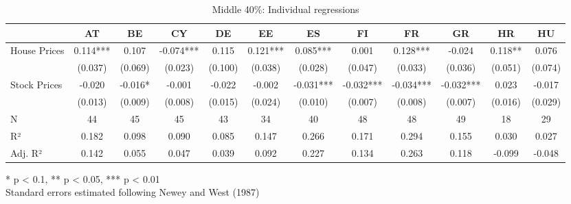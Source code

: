 \documentclass[
  a4paper,
  DIV=11,
  numbers=noendperiod]{scrartcl}
\begin{document}
\begin{landscape}

\begin{table}[h]
\caption{Middle 40\%: Individual regressions} 
\fontsize{7.5pt}{9.0pt}\selectfont
\begin{tabular*}{\linewidth}{@{\extracolsep{\fill}}lccccccccccc}
\toprule
  & AT & BE & CY & DE & EE & ES & FI & FR & GR & HR & HU \\ 
\midrule\addlinespace[2.5pt]
House Prices & 0.114*** & 0.107 & -0.074*** & 0.115 & 0.121*** & 0.085*** & 0.001 & 0.128*** & -0.024 & 0.118** & 0.076 \\ 
 & (0.037) & (0.069) & (0.023) & (0.100) & (0.038) & (0.028) & (0.047) & (0.033) & (0.036) & (0.051) & (0.074) \\ 
Stock Prices & -0.020 & -0.016* & -0.001 & -0.022 & -0.002 & -0.031*** & -0.032*** & -0.034*** & -0.032*** & 0.023 & -0.017 \\ 
{} & {(0.013)} & {(0.009)} & {(0.008)} & {(0.015)} & {(0.024)} & {(0.010)} & {(0.007)} & {(0.008)} & {(0.007)} & {(0.016)} & {(0.029)} \\ 
N & 44 & 45 & 45 & 43 & 34 & 40 & 48 & 48 & 49 & 18 & 29 \\ 
R² & 0.182 & 0.098 & 0.090 & 0.085 & 0.147 & 0.266 & 0.171 & 0.294 & 0.155 & 0.030 & 0.027 \\ 
Adj. R² & 0.142 & 0.055 & 0.047 & 0.039 & 0.092 & 0.227 & 0.134 & 0.263 & 0.118 & -0.099 & -0.048 \\ 
\bottomrule
\end{tabular*}
\begin{minipage}{\linewidth}
* p < 0.1, ** p < 0.05, *** p < 0.01\\
Standard errors estimated following Newey and West (1987)\\
\end{minipage}
\end{table}





\end{landscape}
\end{document}
